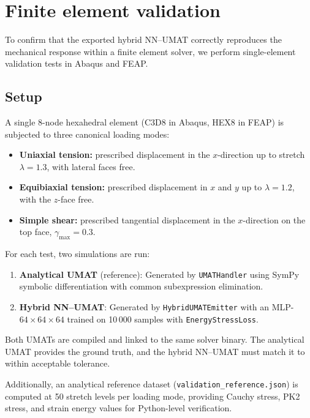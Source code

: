 \section{Finite element validation}
\label{sec:fe_validation}

To confirm that the exported hybrid NN--UMAT correctly reproduces the
mechanical response within a finite element solver, we perform single-element
validation tests in Abaqus and FEAP.

\subsection{Setup}
\label{sec:fe_validation:setup}

A single 8-node hexahedral element (C3D8 in Abaqus, HEX8 in FEAP) is
subjected to three canonical loading modes:
\begin{itemize}
  \item \textbf{Uniaxial tension:} prescribed displacement in the $x$-direction
    up to stretch $\lambda = 1.3$, with lateral faces free.
  \item \textbf{Equibiaxial tension:} prescribed displacement in $x$ and $y$
    up to $\lambda = 1.2$, with the $z$-face free.
  \item \textbf{Simple shear:} prescribed tangential displacement in the
    $x$-direction on the top face, $\gamma_\text{max} = 0.3$.
\end{itemize}

For each test, two simulations are run:
\begin{enumerate}
  \item \textbf{Analytical UMAT} (reference): Generated by
    \texttt{UMATHandler} using SymPy symbolic differentiation with common
    subexpression elimination.
  \item \textbf{Hybrid NN--UMAT}: Generated by \texttt{HybridUMATEmitter}
    with an MLP-$64\times64\times64$ trained on 10\,000 samples with
    \texttt{EnergyStressLoss}.
\end{enumerate}

Both UMATs are compiled and linked to the same solver binary.  The analytical
UMAT provides the ground truth, and the hybrid NN--UMAT must match it to
within acceptable tolerance.

Additionally, an analytical reference dataset
(\texttt{validation\_reference.json}) is computed at 50 stretch levels per
loading mode, providing Cauchy stress, PK2 stress, and strain energy values
for Python-level verification.

